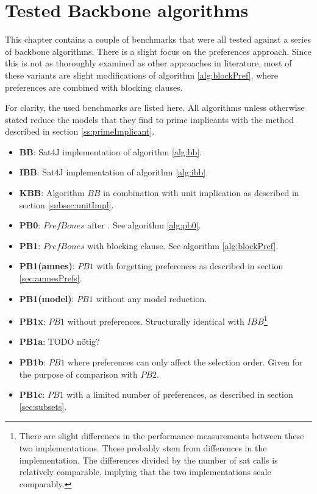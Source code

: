 \section{Tested Backbone algorithms}

This chapter contains a couple of benchmarks that were all tested against a series of backbone algorithms. There is a slight focus on the preferences approach. Since this is not as thoroughly examined as other approaches in literature, most of these variants are slight modifications of algorithm \ref{alg:blockPref}, where preferences are combined with blocking clauses.

For clarity, the used benchmarks are listed here. All algorithms unless otherwise stated reduce the models that they find to prime implicants with the method described in section \ref{ss:primeImplicant}.
\begin{itemize}
\item \textbf{BB}: Sat4J implementation of algorithm \ref{alg:bb}.
\item \textbf{IBB}: Sat4J implementation of algorithm \ref{alg:ibb}.
\item \textbf{KBB}: Algorithm $BB$ in combination with unit implication as described in section \ref{subsec:unitImpl}. 
\item \textbf{PB0}: $PrefBones$ after \cite{PJ18}. See algorithm \ref{alg:pb0}.
\item \textbf{PB1}: $PrefBones$ with blocking clause. See algorithm \ref{alg:blockPref}.
\item \textbf{PB1(amnes)}: $PB1$ with forgetting preferences as described in section \ref{sec:amnesPrefs}.
\item \textbf{PB1(model)}: $PB1$ without any model reduction.
\item \textbf{PB1x}: $PB1$ without preferences. Structurally identical with $IBB$\footnote{There are slight differences in the performance measurements between these two implementations. These probably stem from differences in the implementation. The differences divided by the number of sat calls is relatively comparable, implying that the two implementations scale comparably.}
\item \textbf{PB1a}: TODO nötig?
\item \textbf{PB1b}: $PB1$ where preferences can only affect the selection order. Given for the purpose of comparison with $PB2$.
\item \textbf{PB1c}: $PB1$ with a limited number of preferences, as described in section \ref{sec:subsets}.

\end{itemize}

